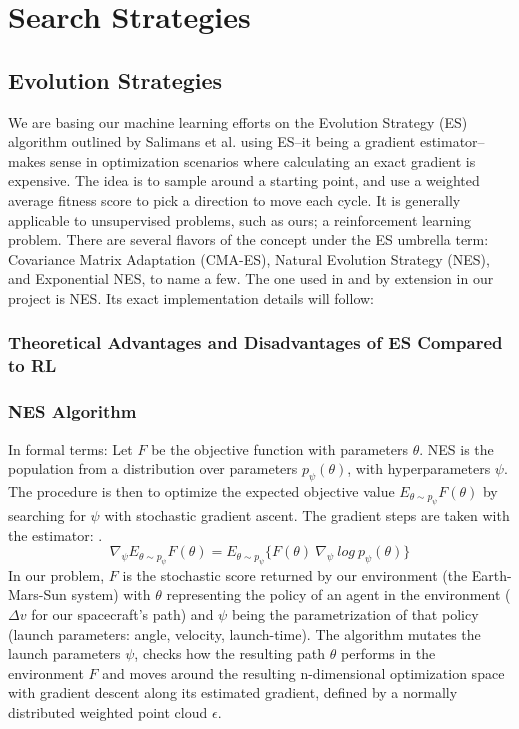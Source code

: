 
\chapter{Search Strategies}
\section{Evolution Strategies}
We are basing our machine learning efforts on the Evolution Strategy (ES) algorithm outlined by Salimans et al. \cite{Salimans2017} using ES--it being a gradient estimator--makes sense in optimization scenarios where calculating an exact gradient is expensive. The idea is to sample around a starting point, and use a weighted average fitness score to pick a direction to move each cycle. It is generally applicable to unsupervised problems, such as ours; a reinforcement learning problem. There are several flavors of the concept under the ES umbrella term: Covariance Matrix Adaptation (CMA-ES), Natural Evolution Strategy (NES), and Exponential NES, to name a few. The one used in \cite{Salimans2017} and by extension in our project is NES. Its exact implementation details will follow:


\subsection{Theoretical Advantages and Disadvantages of ES Compared to RL}

\subsection{NES Algorithm}
In formal terms: Let \(F\) be the objective function with parameters \(\theta\). NES is the population from a distribution over parameters \(p_\psi (\theta)\), with hyperparameters \(\psi\). The procedure is then to optimize the expected objective value \(E_{\theta \sim p_\psi} F(\theta)\) by searching for \(\psi\) with stochastic gradient ascent. The gradient steps are taken with the estimator: \cite{Salimans2017}.
\begin{equation}
    \nabla_\psi E_{\theta \sim p_\psi} F(\theta)
    = E_{\theta \sim p_\psi} \{F(\theta)~\nabla_\psi~log~p_\psi(\theta)\}
\end{equation}
In our problem, \(F\) is the stochastic score returned by our environment (the Earth-Mars-Sun system) with \(\theta\) representing the policy of an agent in the environment ($\Delta v$ for our spacecraft's path) and \(\psi\) being the parametrization of that policy (launch parameters: angle, velocity, launch-time). The algorithm mutates the launch parameters \(\psi\), checks how the resulting path \(\theta\) performs in the environment \(F\) and moves around the resulting n-dimensional optimization space with gradient descent along its estimated gradient, defined by a normally distributed weighted point cloud \(\epsilon\).

